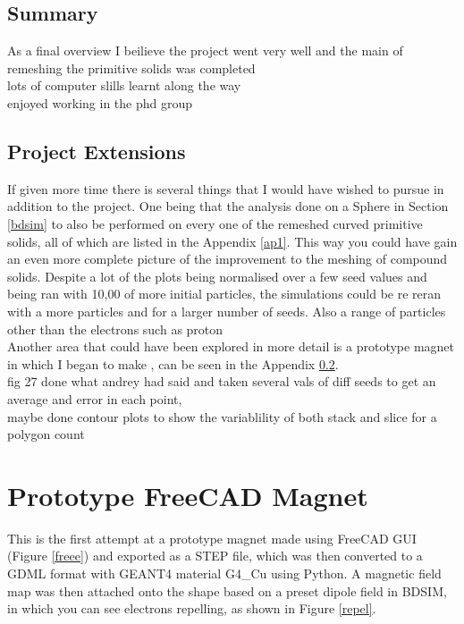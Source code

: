 \documentclass[12pt,a4paper]{article}
\begin{document}
\subsection{Summary}
As a final overview I beilieve the project went very well and the main of remeshing the primitive solids was completed\\
lots of computer slills learnt along the way\\
enjoyed working in the phd group\\



\subsection{Project Extensions}
If given more time there is several things that I  would have wished to pursue in addition to the project. One being that the analysis done on a Sphere in Section \ref{bdsim} to also be performed on every one of the remeshed curved primitive solids, all of which are listed in the Appendix \ref{ap1}. This way you could have gain an even more complete picture of the improvement to the meshing of compound solids. Despite a lot of the plots being normalised over a few seed values and being ran with 10,00 of more initial particles, the simulations could be re reran with a more particles and for a larger number of seeds. Also a range of particles other than the electrons such as proton\\
Another area that could have been explored in more detail is a prototype magnet in which I began to make , can be seen in the Appendix \ref{}.\\
fig 27 done what andrey had said and taken several vals of diff seeds to get an average and error in each point, \\
maybe done contour plots to show the variablility of both stack and slice for a polygon count\\


\newpage
\newpage
\footnotesize



\normalsize
\appendix
\setcounter{figure}{0} 

\section{Prototype FreeCAD Magnet}
\label{mag}
This is the first attempt at a prototype magnet made using FreeCAD GUI (Figure \ref{freee}) and exported as a STEP file, which was then converted to a GDML format with GEANT4 material G4\_Cu using Python. A magnetic field map was then attached onto the shape based on a preset dipole field in BDSIM, in which you can see electrons repelling, as shown in Figure \ref{repel}.
\end{document}

